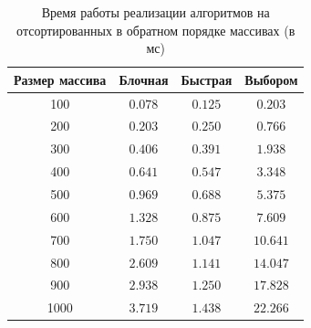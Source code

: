 \begin{table}[h]
	\begin{center}
		\begin{threeparttable}
			\captionsetup{justification=raggedright,singlelinecheck=off}
			\caption{Время работы реализации алгоритмов на отсортированных в обратном порядке массивах (в мс)}
			\label{tbl:time_measurements_sorted}
			\begin{tabular}{|c|c|c|c|}
				\hline
				Размер массива & Блочная & Быстрая & Выбором \\
				\hline
				100 &$ 0.078 $&$ 0.125 $&$ 0.203 $\\
				\hline
				200 &$ 0.203 $&$ 0.250 $&$ 0.766 $\\
				\hline
				300 &$ 0.406 $&$ 0.391 $&$ 1.938 $\\
				\hline
				400 &$ 0.641 $&$ 0.547 $&$ 3.348 $\\
				\hline
				500 &$ 0.969 $&$ 0.688 $&$ 5.375 $\\
				\hline
				600 &$ 1.328 $&$ 0.875 $&$ 7.609 $\\
				\hline
				700 &$ 1.750 $&$ 1.047 $&$ 10.641 $\\
				\hline
				800 &$ 2.609 $&$ 1.141 $&$ 14.047 $\\
				\hline
				900 &$ 2.938 $&$ 1.250 $&$ 17.828 $\\
				\hline
				1000 &$ 3.719 $&$ 1.438 $&$ 22.266 $\\
				\hline
			\end{tabular}
		\end{threeparttable}
	\end{center}
\end{table}

